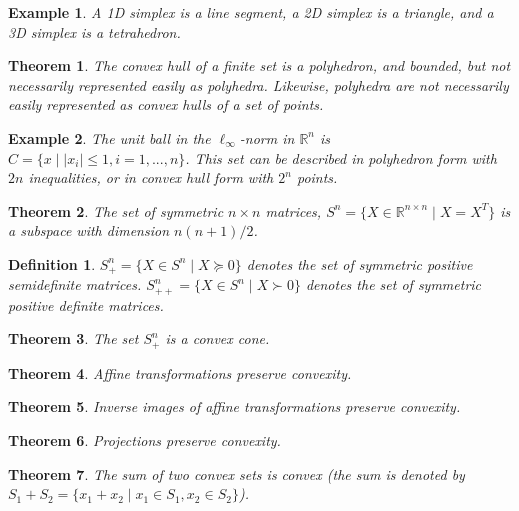 \documentclass[a4paper]{article}
\newtheorem{mytheorem}{Theorem}
\newtheorem{example}{Example}
\newtheorem{mydef}{Definition}
\numberwithin{mytheorem}{section}
\numberwithin{mydef}{section}
\numberwithin{example}{section}
\begin{document}
\begin{example} A 1D simplex is a line segment, a 2D simplex is a triangle, and a 3D simplex is a tetrahedron. 
\end{example}

\begin{mytheorem} The convex hull of a finite set is a polyhedron, and bounded, but not necessarily represented easily as polyhedra. Likewise, polyhedra are not necessarily easily represented as convex hulls of a set of points. \end{mytheorem}

\begin{example} The unit ball in the $\ell_{\infty}$-norm in $\mathbb{R}^{n}$ is $C = \{ x \mid |x_{i}| \leq 1, i = 1,...,n \} $. This set can be described in polyhedron form with $2n$ inequalities, or in convex hull form with $2^{n}$ points.\end{example}

\begin{mytheorem} The set of symmetric $n \times n$ matrices, $S^{n} = \{ X \in \mathbb{R}^{n \times n} \mid X = X^{T} \} $ is a subspace with dimension $n(n+1)/2$.  \end{mytheorem}

\begin{mydef} $S^{n}_{+} = \{ X \in S^{n} \mid X \succeq 0 \}$ denotes the set of symmetric positive semidefinite matrices. $S^{n}_{++} = \{ X \in S^{n} \mid X \succ 0 \}$ denotes the set of symmetric positive definite matrices.  \end{mydef}

\begin{mytheorem} The set $S^{n}_{+}$ is a convex cone.  \end{mytheorem}

\begin{mytheorem} Affine transformations preserve convexity. \end{mytheorem}

\begin{mytheorem} Inverse images of affine transformations preserve convexity. \end{mytheorem}

\begin{mytheorem} Projections preserve convexity. \end{mytheorem}

\begin{mytheorem} The sum of two convex sets is convex (the sum is denoted by $ S_{1} + S_{2} = \{ x_{1} + x_{2} \mid x_{1} \in S_{1}, x_{2} \in S_{2} \} $).  \end{mytheorem}
\end{document}
